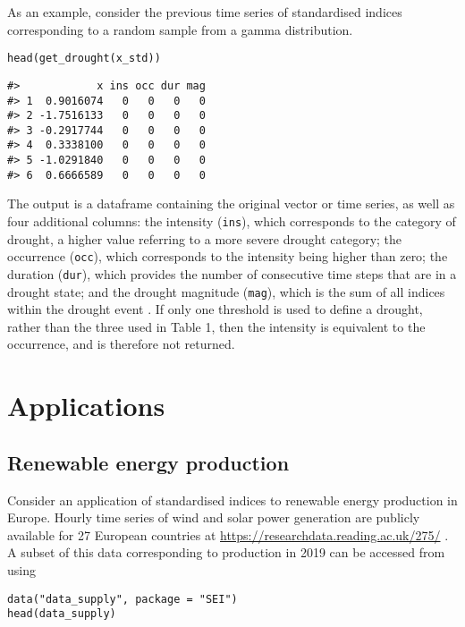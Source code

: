 As an example, consider the previous time series of standardised indices corresponding to a random sample from a gamma distribution.

\begin{verbatim}
head(get_drought(x_std))
\end{verbatim}

\begin{verbatim}
#>            x ins occ dur mag
#> 1  0.9016074   0   0   0   0
#> 2 -1.7516133   0   0   0   0
#> 3 -0.2917744   0   0   0   0
#> 4  0.3338100   0   0   0   0
#> 5 -1.0291840   0   0   0   0
#> 6  0.6666589   0   0   0   0
\end{verbatim}

The output is a dataframe containing the original vector or time series, as well as four additional columns: the intensity (\texttt{ins}), which corresponds to the category of drought, a higher value referring to a more severe drought category; the occurrence (\texttt{occ}), which corresponds to the intensity being higher than zero; the duration (\texttt{dur}), which provides the number of consecutive time steps that are in a drought state; and the drought magnitude (\texttt{mag}), which is the sum of all indices within the drought event \citep[see][for details]{MckeeEtAl1993}. If only one threshold is used to define a drought, rather than the three used in Table 1, then the intensity is equivalent to the occurrence, and is therefore not returned.

\section{Applications}\label{applications}

\subsection{Renewable energy production}\label{renewable-energy-production}

Consider an application of standardised indices to renewable energy production in Europe. Hourly time series of wind and solar power generation are publicly available for 27 European countries at \url{https://researchdata.reading.ac.uk/275/} \citep[see][for details]{BloomfieldEtAl2020}. A subset of this data corresponding to production in 2019 can be accessed from  using

\begin{verbatim}
data("data_supply", package = "SEI")
head(data_supply)
\end{verbatim}

